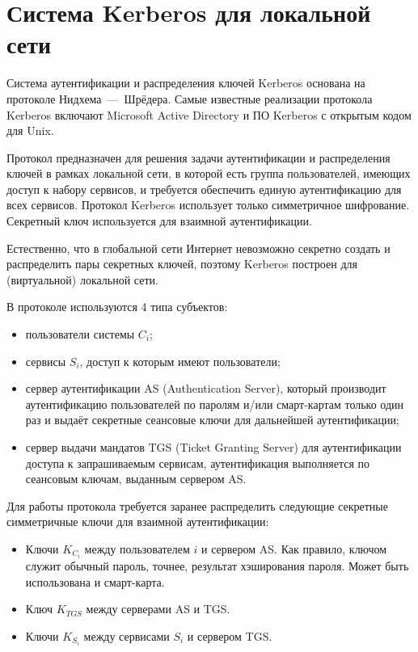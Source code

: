 \section{Система Kerberos для локальной сети}

Система аутентификации и распределения ключей Kerberos основана на протоколе Нидхема~---~Шрёдера. Самые известные реализации протокола Kerberos включают Microsoft Active Directory и ПО Kerberos с открытым кодом для Unix.

Протокол предназначен для решения задачи аутентификации и распределения ключей в рамках локальной сети, в которой есть группа пользователей, имеющих доступ к набору сервисов, и требуется обеспечить единую аутентификацию для всех сервисов. Протокол Kerberos использует только симметричное шифрование. Секретный ключ используется для взаимной аутентификации.

Естественно, что в глобальной сети Интернет невозможно секретно создать и распределить пары секретных ключей, поэтому Kerberos построен для (виртуальной) локальной сети.

В протоколе используются 4 типа субъектов:

\begin{itemize}
    \item пользователи системы $C_i$;
    \item сервисы $S_i$, доступ к которым имеют пользователи;
    \item сервер аутентификации AS (Authentication Server), который производит аутентификацию пользователей по паролям и/или смарт-картам только один раз и выдаёт секретные сеансовые ключи для дальнейшей аутентификации;
    \item сервер выдачи мандатов TGS (Ticket Granting Server) для аутентификации доступа к запрашиваемым сервисам, аутентификация выполняется по сеансовым ключам, выданным сервером AS.
\end{itemize}

Для работы протокола требуется заранее распределить следующие секретные симметричные ключи для взаимной аутентификации:
\begin{itemize}
    \item Ключи $K_{C_i}$ между пользователем $i$ и сервером AS. Как правило, ключом служит обычный пароль, точнее, результат хэширования пароля. Может быть использована и смарт-карта.
    \item Ключ $K_{TGS}$ между серверами AS и TGS.
    \item Ключи $K_{S_i}$ между сервисами $S_i$ и сервером TGS.
\end{itemize}

